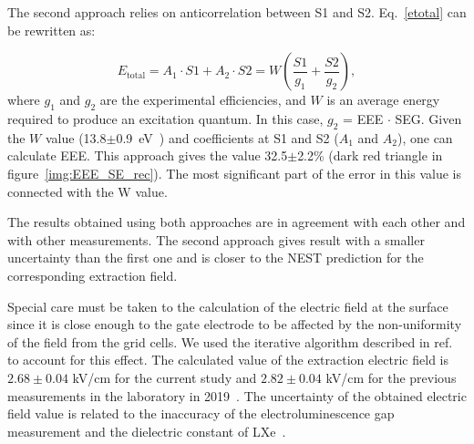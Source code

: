 \documentclass[a4paper,11pt]{article}
\begin{document}
The second approach relies on anticorrelation between S1 and S2. Eq.~\ref{etotal} can be rewritten as:

\begin{equation}
\label{etotal_eee}
    E_{\text{total}} = A_1\cdot S1+A_2\cdot S2 = W(\frac{S1}{g_{1}}+\frac{S2}{g_{2}}),
\end{equation}
where $g_{1}$ and $g_{2}$ are the experimental efficiencies, and $W$ is an average energy required to produce an excitation quantum. In this case, $g_{2}$ = EEE $\cdot$ SEG. Given the $W$ value (13.8$\pm$0.9~eV~\cite{Doke_2002}) and coefficients at S1 and S2 ($A_1$ and $A_2$), one can calculate EEE. This approach gives the value 32.5$\pm$2.2\% (dark red triangle in figure~\ref{img:EEE_SE_rec}). The most significant part of the error in this value is connected with the W value.

The results obtained using both approaches are in agreement with each other and with other measurements. The second approach gives result with a smaller uncertainty than the first one and is closer to the NEST prediction for the corresponding extraction field.

Special care must be taken to the calculation of the electric field at the surface since it is close enough to the gate electrode to be affected by the non-uniformity of the field from the grid cells. We used the iterative algorithm described in ref.~\cite{READ1999363} to account for this effect. The calculated value of the extraction electric field is $2.68\pm0.04$ kV/cm for the current study and $2.82\pm0.04$ kV/cm for the previous measurements in the laboratory in 2019~\cite{RED100_2019}. The uncertainty of the obtained electric field value is related to the inaccuracy of the electroluminescence gap measurement and the dielectric constant of LXe~\cite{10.1063/1.1724850,doi:10.1139/p70-033}. 
\end{document}
